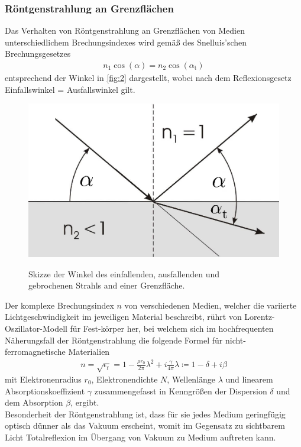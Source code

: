 \documentclass[12pt]{article}
\begin{document}
\subsubsection{Röntgenstrahlung an Grenzflächen}
Das Verhalten von Röntgenstrahlung an Grenzflächen von Medien unterschiedlichem Brechungsindexes wird gemäß des Snelluis'schen Brechungsgesetzes
\begin{align}
  n_1 \cos(\alpha) = n_2 \cos(\alpha_\text{t})\label{eq:snellius}
\end{align}
entsprechend der Winkel in \autoref{fig:2} dargestellt, wobei nach dem Reflexionsgesetz Einfallswinkel = Ausfallswinkel gilt.
\begin{figure}[H]
  \centering
  \includegraphics[scale=0.3]{Ressourcen/Snellius.png}
  \caption{Skizze der Winkel des einfallenden, ausfallenden und\\ gebrochenen Strahls and einer Grenzfläche.}\cite{uni_giessen}\label{fig:2}
\end{figure}
Der komplexe Brechungsindex $n$ von verschiedenen Medien, welcher die variierte Lichtgeschwindigkeit im jeweiligen Material beschreibt, rührt von Lorentz-Oszillator-Modell für Fest-körper her, bei welchem sich im hochfrequenten Näherungsfall der Röntgenstrahlung die folgende Formel für nicht-ferromagnetische Materialien  
\begin{align}
  n=\sqrt{\epsilon_\text{r}}=1-\frac{\rho r_0}{2\pi}\lambda^2+i \frac{\gamma}{4\pi}\lambda \coloneqq 1-\delta+i\beta\label{eq:n}
\end{align}
mit Elektronenradius $r_0$, Elektronendichte $N$, Wellenlänge $\lambda$ und linearem Absorptionskoeffizient $\gamma$ zusammengefasst in Kenngrößen der Dispersion $\delta$ und dem Absorption $\beta$, ergibt. 
\\\linebreak Besonderheit der Röntgenstrahlung ist, dass für sie jedes Medium geringfügig optisch dünner als das Vakuum erscheint, womit im Gegensatz zu sichtbarem Licht Totalreflexion im Übergang von Vakuum zu Medium auftreten kann.
\end{document}

